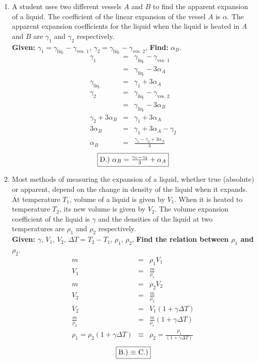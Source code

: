\documentclass[12pt]{article}
\begin{document}
\begin{enumerate}
	\item A student uses two different vessels $A$ and $B$ to find the apparent expansion of a liquid. The coefficient of the linear expansion of the vessel $A$ is $\alpha$. The apparent expansion coefficients for the liquid when the liquid is heated in $A$ and $B$ are $\gamma_1$ and $\gamma_2$ respectively.\\
	\textbf {Given: } $\gamma_1 = \gamma_{\mbox{liq.}} - \gamma_{\mbox{ves. 1}}$,  $\gamma_2 = \gamma_{\mbox{liq.}} - \gamma_{\mbox{ves. 2}}$, \textbf{Find: }$\alpha_B$.
	\begin{eqnarray*}
		 \gamma_1 &=& \gamma_{\mbox{liq.}} - \gamma_{\mbox{ves. 1}}\\
		 &=& \gamma_{\mbox{liq.}} - 3 \alpha_A\\
		 \gamma_{\mbox{liq.}} &=& \gamma_1 + 3 \alpha_A\\
		 \gamma_2 &=& \gamma_{\mbox{liq.}} - \gamma_{\mbox{ves. 2}}\\
		 &=& \gamma_{\mbox{liq.}} - 3 \alpha_B\\
		 \gamma_2 + 3 \alpha_B &=& \gamma_1 + 3 \alpha_A\\
		 3 \alpha_B &=& \gamma_1 + 3\alpha_A - \gamma_2\\
		 \alpha_B &=& \frac{\gamma_1 - \gamma_2 + 3\alpha_A}{3}		 
	\end{eqnarray*}
	$$\fbox{D.) $\alpha_B = \frac{\gamma_1 - \gamma_2}{3} + \alpha_A$}$$
	
	\item Most methods of measuring the expansion of a liquid, whether true
(absolute) or apparent, depend on the change in density of the liquid when it
expands. At temperature $T_1$, volume of a liquid is given by $V_1$. When it is heated to temperature $T_2$, its new volume is given by $V_2$. The volume expansion coefficient of the liquid is $\gamma$ and the densities of the liquid at two temperatures are $\rho_1$ and $\rho_2$ respectively.\\
	\textbf {Given: } $\gamma$, $V_1$, $V_2$, $\Delta T = T_2 - T_1$, $\rho_1$, $\rho_2$,  \textbf{Find the relation between $\rho_1$ and $\rho_2$}.
	\begin{eqnarray*}
		 m &=& \rho_1 V_1\\
		 V_1 &=& \frac{m}{\rho_1}\\
		 m &=& \rho_2 V_2\\
		 V_2 &=& \frac{m}{\rho_2}\\
		 V_2 &=& V_1(1 + \gamma\Delta T)\\
		 \frac{m}{\rho_2} &=& \frac{m}{\rho_1}(1 + \gamma\Delta T)\\
		 \rho_1 = \rho_2(1 + \gamma\Delta T) &\equiv& \rho_2 = \frac{\rho_1}{(1 + \gamma\Delta T)}
	\end{eqnarray*}
	$$\fbox{B.) $\equiv$ C.)}$$
	

\end{enumerate}
\end{document}
